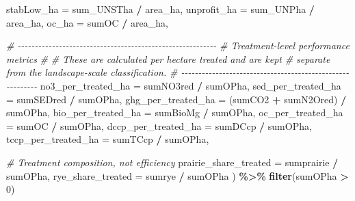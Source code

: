 \documentclass[
]{article}
\newenvironment{Shaded}{\begin{snugshade}}{\end{snugshade}}
\newcommand{\AttributeTok}[1]{\textcolor[rgb]{0.13,0.29,0.53}{#1}}
\newcommand{\CommentTok}[1]{\textcolor[rgb]{0.56,0.35,0.01}{\textit{#1}}}
\newcommand{\DecValTok}[1]{\textcolor[rgb]{0.00,0.00,0.81}{#1}}
\newcommand{\FunctionTok}[1]{\textcolor[rgb]{0.13,0.29,0.53}{\textbf{#1}}}
\newcommand{\NormalTok}[1]{#1}
\newcommand{\SpecialCharTok}[1]{\textcolor[rgb]{0.81,0.36,0.00}{\textbf{#1}}}
\begin{document}
\begin{Shaded}
\begin{Highlighting}[]
    
    \AttributeTok{stabLow\_ha =}\NormalTok{ sum\_UNSTha }\SpecialCharTok{/}\NormalTok{ area\_ha,}
    \AttributeTok{unprofit\_ha =}\NormalTok{ sum\_UNPha }\SpecialCharTok{/}\NormalTok{ area\_ha,}
    \AttributeTok{oc\_ha =}\NormalTok{ sumOC }\SpecialCharTok{/}\NormalTok{ area\_ha,}

    \CommentTok{\# {-}{-}{-}{-}{-}{-}{-}{-}{-}{-}{-}{-}{-}{-}{-}{-}{-}{-}{-}{-}{-}{-}{-}{-}{-}{-}{-}{-}{-}{-}{-}{-}{-}{-}{-}{-}{-}{-}{-}{-}{-}{-}{-}{-}{-}{-}{-}{-}{-}{-}{-}{-}{-}{-}{-}{-}{-}{-}}
    \CommentTok{\# Treatment{-}level performance metrics}
    \CommentTok{\#}
    \CommentTok{\# These are calculated per hectare treated and are kept}
    \CommentTok{\# separate from the landscape{-}scale classification.}
    \CommentTok{\# {-}{-}{-}{-}{-}{-}{-}{-}{-}{-}{-}{-}{-}{-}{-}{-}{-}{-}{-}{-}{-}{-}{-}{-}{-}{-}{-}{-}{-}{-}{-}{-}{-}{-}{-}{-}{-}{-}{-}{-}{-}{-}{-}{-}{-}{-}{-}{-}{-}{-}{-}{-}{-}{-}{-}{-}{-}{-}}
    \AttributeTok{no3\_per\_treated\_ha =}\NormalTok{ sumNO3red }\SpecialCharTok{/}\NormalTok{ sumOPha,}
    \AttributeTok{sed\_per\_treated\_ha =}\NormalTok{ sumSEDred }\SpecialCharTok{/}\NormalTok{ sumOPha,}
    \AttributeTok{ghg\_per\_treated\_ha =}\NormalTok{ (sumCO2 }\SpecialCharTok{+}\NormalTok{ sumN2Ored) }\SpecialCharTok{/}\NormalTok{ sumOPha,}
    \AttributeTok{bio\_per\_treated\_ha =}\NormalTok{ sumBioMg }\SpecialCharTok{/}\NormalTok{ sumOPha,}
    \AttributeTok{oc\_per\_treated\_ha =}\NormalTok{ sumOC }\SpecialCharTok{/}\NormalTok{ sumOPha,}
    \AttributeTok{dccp\_per\_treated\_ha =}\NormalTok{ sumDCcp }\SpecialCharTok{/}\NormalTok{ sumOPha,}
    \AttributeTok{tccp\_per\_treated\_ha =}\NormalTok{ sumTCcp }\SpecialCharTok{/}\NormalTok{ sumOPha,}

    \CommentTok{\# Treatment composition, not efficiency}
    \AttributeTok{prairie\_share\_treated =}\NormalTok{ sumprairie }\SpecialCharTok{/}\NormalTok{ sumOPha,}
    \AttributeTok{rye\_share\_treated =}\NormalTok{ sumrye }\SpecialCharTok{/}\NormalTok{ sumOPha}
\NormalTok{  ) }\SpecialCharTok{\%\textgreater{}\%}
  \FunctionTok{filter}\NormalTok{(sumOPha }\SpecialCharTok{\textgreater{}} \DecValTok{0}\NormalTok{)}
\end{Highlighting}
\end{Shaded}
\end{document}
